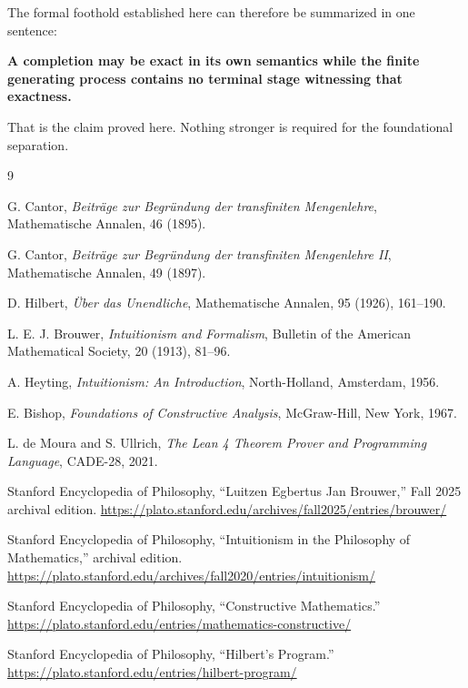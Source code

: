 \documentclass[11pt,a4paper]{article}
\begin{document}
The formal foothold established here can therefore be summarized in
one sentence:

\begin{center}
\textbf{A completion may be exact in its own semantics while the
finite generating process contains no terminal stage witnessing that
exactness.}
\end{center}

That is the claim proved here.  Nothing stronger is required for the
foundational separation.


\begin{thebibliography}{9}

G. Cantor,
\emph{Beiträge zur Begründung der transfiniten Mengenlehre},
Mathematische Annalen, 46 (1895).

G. Cantor,
\emph{Beiträge zur Begründung der transfiniten Mengenlehre II},
Mathematische Annalen, 49 (1897).

D. Hilbert,
\emph{Über das Unendliche},
Mathematische Annalen, 95 (1926), 161--190.

L. E. J. Brouwer,
\emph{Intuitionism and Formalism},
Bulletin of the American Mathematical Society,
20 (1913), 81--96.

A. Heyting,
\emph{Intuitionism: An Introduction},
North-Holland, Amsterdam, 1956.

E. Bishop,
\emph{Foundations of Constructive Analysis},
McGraw-Hill, New York, 1967.

L. de Moura and S. Ullrich,
\emph{The Lean 4 Theorem Prover and Programming Language},
CADE-28, 2021.


Stanford Encyclopedia of Philosophy,
``Luitzen Egbertus Jan Brouwer,''
Fall 2025 archival edition.
\url{https://plato.stanford.edu/archives/fall2025/entries/brouwer/}

Stanford Encyclopedia of Philosophy,
``Intuitionism in the Philosophy of Mathematics,''
archival edition.
\url{https://plato.stanford.edu/archives/fall2020/entries/intuitionism/}

Stanford Encyclopedia of Philosophy,
``Constructive Mathematics.''
\url{https://plato.stanford.edu/entries/mathematics-constructive/}

Stanford Encyclopedia of Philosophy,
``Hilbert's Program.''
\url{https://plato.stanford.edu/entries/hilbert-program/}


\end{thebibliography}
\end{document}
